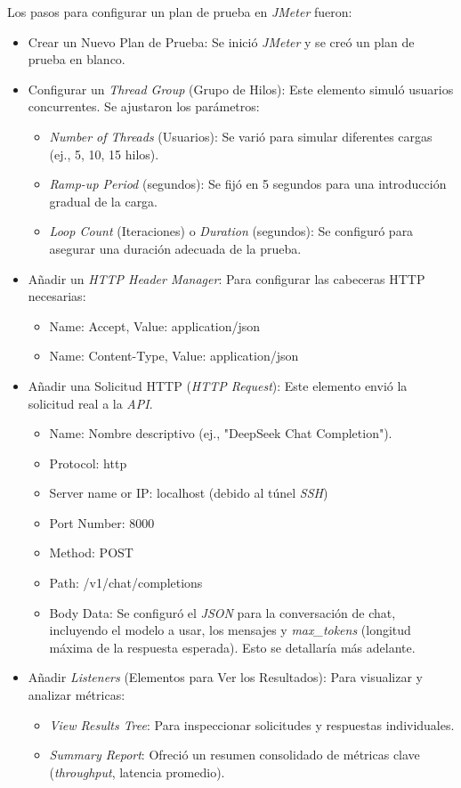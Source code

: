 Los pasos para configurar un plan de prueba en \textit{JMeter} fueron:
\begin{itemize}
    \item Crear un Nuevo Plan de Prueba: Se inició \textit{JMeter} y se creó un plan de prueba en blanco.
    \item Configurar un \textit{Thread Group} (Grupo de Hilos): Este elemento simuló usuarios concurrentes. Se ajustaron los parámetros:
    \begin{itemize}
        \item \textit{Number of Threads} (Usuarios): Se varió para simular diferentes cargas (ej., 5, 10, 15 hilos).
        \item \textit{Ramp-up Period} (segundos): Se fijó en 5 segundos para una introducción gradual de la carga.
        \item \textit{Loop Count} (Iteraciones) o \textit{Duration} (segundos): Se configuró para asegurar una duración adecuada de la prueba.
    \end{itemize}
    \item Añadir un \textit{HTTP Header Manager}: Para configurar las cabeceras HTTP necesarias:
    \begin{itemize}
        \item Name: Accept, Value: application/json
        \item Name: Content-Type, Value: application/json
    \end{itemize}
    \item Añadir una Solicitud HTTP (\textit{HTTP Request}): Este elemento envió la solicitud real a la \textit{API}.
    \begin{itemize}
        \item Name: Nombre descriptivo (ej., "DeepSeek Chat Completion").
        \item Protocol: http
        \item Server name or IP: localhost (debido al túnel \textit{SSH})
        \item Port Number: 8000
        \item Method: POST
        \item Path: /v1/chat/completions
        \item Body Data: Se configuró el \textit{JSON} para la conversación de chat, incluyendo el modelo a usar, los mensajes y \textit{max\_tokens} (longitud máxima de la respuesta esperada). Esto se detallaría más adelante.
    \end{itemize}
    \item Añadir \textit{Listeners} (Elementos para Ver los Resultados): Para visualizar y analizar métricas:
    \begin{itemize}
        \item \textit{View Results Tree}: Para inspeccionar solicitudes y respuestas individuales.
        \item \textit{Summary Report}: Ofreció un resumen consolidado de métricas clave (\textit{throughput}, latencia promedio).
    \end{itemize}
\end{itemize}
